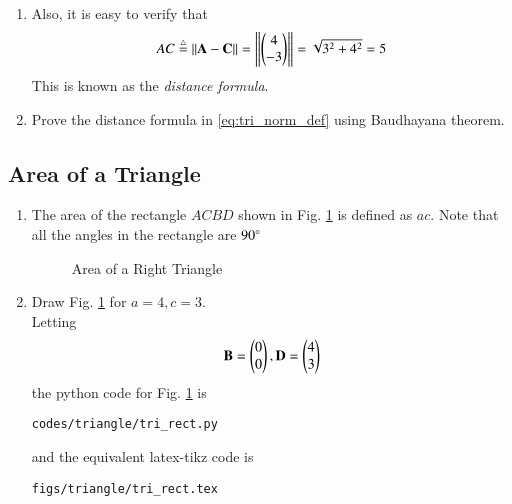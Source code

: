 \begin{enumerate}[label=\arabic*.,ref=\thesubsection.\theenumi]
\item Also, it is easy to verify that
%
\begin{align}
\label{eq:tri_norm_def}
AC \stackrel{\triangle}{=}  \left\lVert\mathbf{A}-\mathbf{C}\right\rVert =  \left\lVert\begin{pmatrix}4\\-3\end{pmatrix}\right\rVert = \sqrt{3^2+4^2} = 5
\end{align}
%
This is known as the {\em distance formula}.
%
\item Prove the distance formula in \eqref{eq:tri_norm_def} using Baudhayana theorem.

\end{enumerate}
\subsection{Area of a Triangle}
\renewcommand{\theequation}{\theenumi}
\begin{enumerate}[label=\arabic*.,ref=\thesubsection.\theenumi]
%



\item
	The area of the rectangle $ACBD$ shown in Fig. \ref{fig:tri_rect} is defined as $ac$. Note that all the angles in the rectangle are $90\degree$

\begin{figure}[!ht]
	\begin{center}
		
		\resizebox{\columnwidth}{!}{}
	\end{center}
	\caption{Area of a Right Triangle}
	\label{fig:tri_rect}	
\end{figure}
%
\item Draw Fig. \ref{fig:tri_rect} for $a = 4, c =3$.
\label{const:tri_rect}
\\
\solution Letting
%
\begin{align}
\mathbf{B} = \begin{pmatrix}0 \\  0\end{pmatrix}, 
\mathbf{D} = \begin{pmatrix}4 \\  3\end{pmatrix} 
\label{eq:tri_rect}
\end{align}
%
the python code for  Fig. \ref{fig:tri_rect} is
\begin{lstlisting}
codes/triangle/tri_rect.py
\end{lstlisting}
%
and the equivalent latex-tikz code is
%
\begin{lstlisting}
figs/triangle/tri_rect.tex
\end{lstlisting}


\end{enumerate}
